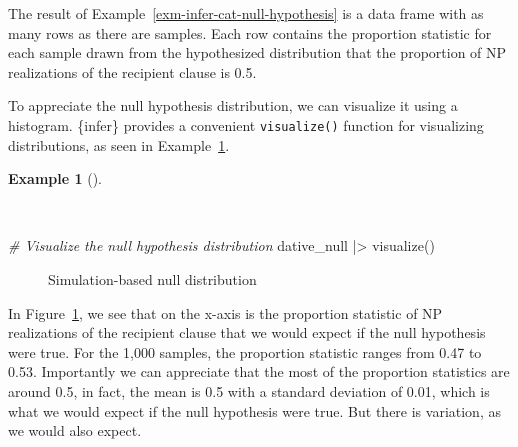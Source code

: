 \documentclass[
  letterpaper,
  krantz1]{latex/krantz-mod}
\newenvironment{Shaded}{\begin{snugshade}}{\end{snugshade}}
\newcommand{\CommentTok}[1]{\textcolor[rgb]{0.00,0.00,0.00}{\textit{#1}}}
\newcommand{\FunctionTok}[1]{\textcolor[rgb]{0.00,0.00,0.00}{#1}}
\newcommand{\NormalTok}[1]{\textcolor[rgb]{0.00,0.00,0.00}{#1}}
\newcommand{\SpecialCharTok}[1]{\textcolor[rgb]{0.00,0.00,0.00}{#1}}
\theoremstyle{definition}
\newtheorem{example}{Example}[chapter]
\theoremstyle{definition}
\theoremstyle{remark}
\begin{document}
The result of Example~\ref{exm-infer-cat-null-hypothesis} is a data
frame with as many rows as there are samples. Each row contains the
proportion statistic for each sample drawn from the hypothesized
distribution that the proportion of NP realizations of the recipient
clause is 0.5.

To appreciate the null hypothesis distribution, we can visualize it
using a histogram. \{infer\} provides a convenient \texttt{visualize()}
function for visualizing distributions, as seen in
Example~\ref{exm-infer-cat-null-hypothesis-vis}.

\begin{example}[]\protect\hypertarget{exm-infer-cat-null-hypothesis-vis}{}\label{exm-infer-cat-null-hypothesis-vis}

~

\begin{Shaded}
\begin{Highlighting}[numbers=left,,]
\CommentTok{\# Visualize the null hypothesis distribution}
\NormalTok{dative\_null }\SpecialCharTok{|\textgreater{}} \FunctionTok{visualize}\NormalTok{()}
\end{Highlighting}
\end{Shaded}

\begin{figure}[!htb]


\caption{\label{fig-infer-cat-null-hypothesis}Simulation-based null
distribution}

\end{figure}%

\end{example}

In Figure~\ref{fig-infer-cat-null-hypothesis}, we see that on the x-axis
is the proportion statistic of NP realizations of the recipient clause
that we would expect if the null hypothesis were true. For the 1,000
samples, the proportion statistic ranges from 0.47 to 0.53. Importantly
we can appreciate that the most of the proportion statistics are around
0.5, in fact, the mean is 0.5 with a standard deviation of 0.01, which
is what we would expect if the null hypothesis were true. But there is
variation, as we would also expect.
\end{document}
